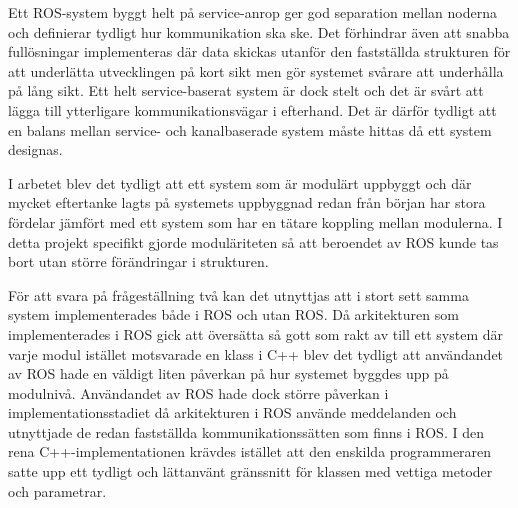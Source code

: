Ett ROS-system byggt helt på service-anrop ger god separation mellan noderna och definierar tydligt hur kommunikation ska ske. Det förhindrar även att snabba fullösningar implementeras där data skickas utanför den fastställda strukturen för att underlätta utvecklingen på kort sikt men gör systemet svårare att underhålla på lång sikt. Ett helt service-baserat system är dock stelt och det är svårt att lägga till ytterligare kommunikationsvägar i efterhand. Det är därför tydligt att en balans mellan service- och kanalbaserade system måste hittas då ett system designas.

I arbetet blev det tydligt att ett system som är modulärt uppbyggt och där mycket eftertanke lagts på systemets uppbyggnad redan från början har stora fördelar jämfört med ett system som har en tätare koppling mellan modulerna. I detta projekt specifikt gjorde moduläriteten så att beroendet av ROS kunde tas bort utan större förändringar i strukturen.

För att svara på frågeställning två kan det utnyttjas att i stort sett samma system implementerades både i ROS och utan ROS. Då arkitekturen som implementerades i ROS gick att översätta så gott som rakt av till ett system där varje modul istället motsvarade en klass i C++ blev det tydligt att användandet av ROS hade en väldigt liten påverkan på hur systemet byggdes upp på modulnivå. Användandet av ROS hade dock större påverkan i implementationsstadiet då arkitekturen i ROS använde meddelanden och utnyttjade de redan fastställda kommunikationssätten som finns i ROS. I den rena C++-implementationen krävdes istället att den enskilda programmeraren satte upp ett tydligt och lättanvänt gränssnitt för klassen med vettiga metoder och parametrar.
